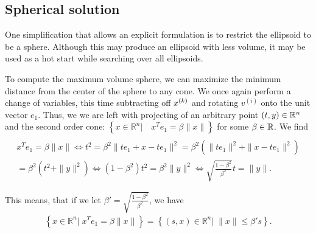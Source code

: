 %             
% 


\subsection{Spherical solution}
\label{spherical_solution_description}

One simplification that allows an explicit formulation is to restrict the ellipsoid to be a sphere.
Although this may produce an ellipsoid with less volume, it may be used as a hot start while searching over all ellipsoids.

To compute the maximum volume sphere, we can maximize the minimum distance from the center of the sphere to any cone.
We once again perform a change of variables, this time subtracting off $x^{(k)}$ and rotating $v^{(i)}$ onto the unit vector $e_1$.
Thus, we we are left with projecting of an arbitrary point $(t, y) \in \mathbb R^n$ and the second order cone:
$\left\{ x \in \mathbb R^n | \quad x^Te_1 = \beta \|x\| \right\}$ 
for some $\beta \in \mathbb R$.
We find
\begin{align*}
 \\
x^Te_1 = \beta \|x\| 
 \Longleftrightarrow t^2 = \beta^2 \|te_1  + x - t e_1\|^2 
  = \beta^2 \left(\|te_1\|^2  + \|x - t e_1\|^2\right) \\
= \beta^2 \left(t^2  + \|y\|^2 \right) 
 \Longleftrightarrow (1 - \beta^2)t^2 = \beta^2 \|y\|^2 
 \Longleftrightarrow \sqrt{\frac{1 - \beta^2}{ \beta^2}} t = \|y\|.
\end{align*}


This means, that if we let $\beta' = \sqrt{\frac{1 - \beta^2}{\beta^2}}$, we have
\begin{align*}
\left\{ x \in \mathbb R^n | \; x^Te_1 = \beta \|x\| \right\} = \left \{(s, x)\in \mathbb R^n | \; \|x\| \le \beta' s \right\}.
\end{align*}

